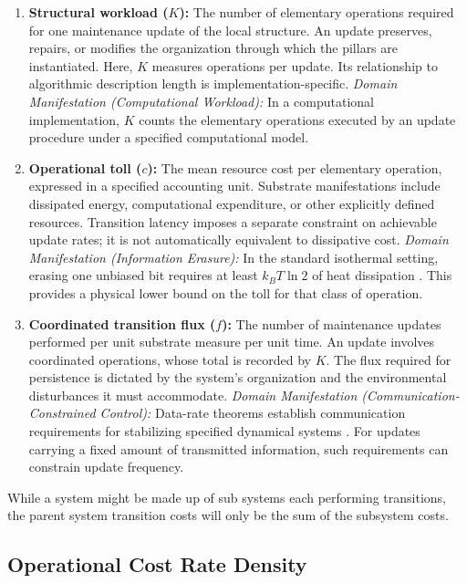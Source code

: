 \begin{enumerate}
    \item \textbf{Structural workload ($K$):}
    The number of elementary operations required for one maintenance update of the local structure. An update preserves, repairs, or modifies the organization through which the pillars are instantiated. Here, $K$ measures operations per update. Its relationship to algorithmic description length \cite{kolmogorov_three_1968} is implementation-specific.
    \textit{Domain Manifestation (Computational Workload):} In a computational implementation, $K$ counts the elementary operations executed by an update procedure under a specified computational model.

    \item \textbf{Operational toll ($c$):}
    The mean resource cost per elementary operation, expressed in a specified accounting unit. Substrate manifestations include dissipated energy, computational expenditure, or other explicitly defined resources. Transition latency imposes a separate constraint on achievable update rates; it is not automatically equivalent to dissipative cost.
    \textit{Domain Manifestation (Information Erasure):} In the standard isothermal setting, erasing one unbiased bit requires at least $k_B T\ln 2$ of heat dissipation \cite{landauer_irreversibility_1961}. This provides a physical lower bound on the toll for that class of operation.

    \item \textbf{Coordinated transition flux ($f$):}
    The number of maintenance updates performed per unit substrate measure per unit time. An update involves coordinated operations, whose total is recorded by $K$. The flux required for persistence is dictated by the system's organization and the environmental disturbances it must accommodate.
    \textit{Domain Manifestation (Communication-Constrained Control):} Data-rate theorems establish communication requirements for stabilizing specified dynamical systems \cite{nair_feedback_2007}. For updates carrying a fixed amount of transmitted information, such requirements can constrain update frequency.
\end{enumerate}

While a system might be made up of sub systems each performing transitions, the parent system transition costs will only be the sum of the subsystem costs.


\subsection{Operational Cost Rate Density}
\label{subsec:dissipation_density}

